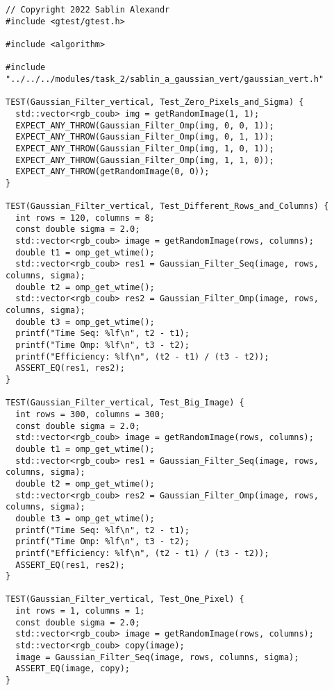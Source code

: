 \documentclass{report}
\begin{document}
\begin{lstlisting}
// Copyright 2022 Sablin Alexandr
#include <gtest/gtest.h>

#include <algorithm>

#include "../../../modules/task_2/sablin_a_gaussian_vert/gaussian_vert.h"

TEST(Gaussian_Filter_vertical, Test_Zero_Pixels_and_Sigma) {
  std::vector<rgb_coub> img = getRandomImage(1, 1);
  EXPECT_ANY_THROW(Gaussian_Filter_Omp(img, 0, 0, 1));
  EXPECT_ANY_THROW(Gaussian_Filter_Omp(img, 0, 1, 1));
  EXPECT_ANY_THROW(Gaussian_Filter_Omp(img, 1, 0, 1));
  EXPECT_ANY_THROW(Gaussian_Filter_Omp(img, 1, 1, 0));
  EXPECT_ANY_THROW(getRandomImage(0, 0));
}

TEST(Gaussian_Filter_vertical, Test_Different_Rows_and_Columns) {
  int rows = 120, columns = 8;
  const double sigma = 2.0;
  std::vector<rgb_coub> image = getRandomImage(rows, columns);
  double t1 = omp_get_wtime();
  std::vector<rgb_coub> res1 = Gaussian_Filter_Seq(image, rows, columns, sigma);
  double t2 = omp_get_wtime();
  std::vector<rgb_coub> res2 = Gaussian_Filter_Omp(image, rows, columns, sigma);
  double t3 = omp_get_wtime();
  printf("Time Seq: %lf\n", t2 - t1);
  printf("Time Omp: %lf\n", t3 - t2);
  printf("Efficiency: %lf\n", (t2 - t1) / (t3 - t2));
  ASSERT_EQ(res1, res2);
}

TEST(Gaussian_Filter_vertical, Test_Big_Image) {
  int rows = 300, columns = 300;
  const double sigma = 2.0;
  std::vector<rgb_coub> image = getRandomImage(rows, columns);
  double t1 = omp_get_wtime();
  std::vector<rgb_coub> res1 = Gaussian_Filter_Seq(image, rows, columns, sigma);
  double t2 = omp_get_wtime();
  std::vector<rgb_coub> res2 = Gaussian_Filter_Omp(image, rows, columns, sigma);
  double t3 = omp_get_wtime();
  printf("Time Seq: %lf\n", t2 - t1);
  printf("Time Omp: %lf\n", t3 - t2);
  printf("Efficiency: %lf\n", (t2 - t1) / (t3 - t2));
  ASSERT_EQ(res1, res2);
}

TEST(Gaussian_Filter_vertical, Test_One_Pixel) {
  int rows = 1, columns = 1;
  const double sigma = 2.0;
  std::vector<rgb_coub> image = getRandomImage(rows, columns);
  std::vector<rgb_coub> copy(image);
  image = Gaussian_Filter_Seq(image, rows, columns, sigma);
  ASSERT_EQ(image, copy);
}


\end{lstlisting}
\end{document}
